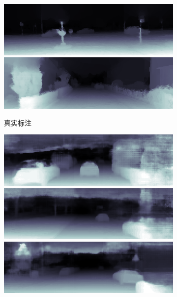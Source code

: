 \begin{figure}[htb]
\begin{subfigure}{0.15\linewidth}
\begin{minipage}[b]{1\linewidth}
  \includegraphics[width=1\linewidth]{figure/kitti_gt/26_09_388.png}\vspace{4pt}
  \includegraphics[width=1\linewidth]{figure/kitti_gt/30_18_642.png}
  \end{minipage}
  \caption{真实标注}
  \end{subfigure}
  \begin{subfigure}{0.15\linewidth}
  \begin{minipage}[b]{1\linewidth}
  \includegraphics[width=1\linewidth]{figure/dorn/2011_09_26_drive_0052_sync_0000000000.png}\vspace{4pt}
  \includegraphics[width=1\linewidth]{figure/dorn/2011_09_26_drive_0013_sync_0000000035.png}\vspace{4pt}
  \includegraphics[width=1\linewidth]{figure/dorn/2011_09_26_drive_0009_sync_0000000260.png}\vspace{4pt}

\end{minipage}
\end{subfigure}
\end{figure}
